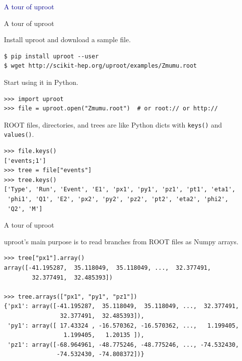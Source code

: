 \documentclass[aspectratio=169]{beamer}
\begin{document}
\begin{frame}{}
\begin{center}
\Huge \textcolor{darkblue}{A tour of uproot}
\end{center}
\end{frame}

\begin{frame}[fragile]{A tour of uproot}
\vspace{0.35 cm}
\small

{\normalsize Install uproot and download a sample file.}

\begin{verbatim}
$ pip install uproot --user
$ wget http://scikit-hep.org/uproot/examples/Zmumu.root
\end{verbatim}

\vspace{0.2 cm}
{\normalsize Start using it in Python.}

\begin{verbatim}
>>> import uproot
>>> file = uproot.open("Zmumu.root")  # or root:// or http://
\end{verbatim}

\vspace{0.2 cm}
{\normalsize ROOT files, directories, and trees are like Python dicts with {\tt\small keys()} and {\tt\small values()}.}

\begin{verbatim}
>>> file.keys()
['events;1']
>>> tree = file["events"]
>>> tree.keys()
['Type', 'Run', 'Event', 'E1', 'px1', 'py1', 'pz1', 'pt1', 'eta1',
 'phi1', 'Q1', 'E2', 'px2', 'py2', 'pz2', 'pt2', 'eta2', 'phi2',
 'Q2', 'M']
\end{verbatim}
\end{frame}

\begin{frame}[fragile]{A tour of uproot}
\vspace{0.5 cm}
\small

{\normalsize uproot's main purpose is to read branches from ROOT files as Numpy arrays.}

\begin{verbatim}
>>> tree["px1"].array()
array([-41.195287,  35.118049,  35.118049, ...,  32.377491,
        32.377491,  32.485393])

>>> tree.arrays(["px1", "py1", "pz1"])
{'px1': array([-41.195287,  35.118049,  35.118049, ...,  32.377491,
                32.377491,  32.485393]),
 'py1': array([ 17.43324 , -16.570362, -16.570362, ...,   1.199405,
                 1.199405,   1.20135 ]),
 'pz1': array([-68.964961, -48.775246, -48.775246, ..., -74.532430,
               -74.532430, -74.808372])}
\end{verbatim}
\end{frame}
\end{document}
